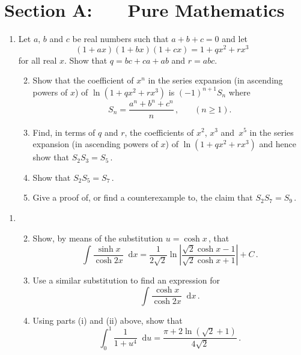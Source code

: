 \documentclass[a4, 11pt]{report}
\newlength{\qspace}
\newcounter{qnumber}
\newenvironment{question}%
 {\vspace{\qspace}
  \begin{enumerate}[\bfseries 1\quad][10]%
    \setcounter{enumi}{\value{qnumber}}%
    \item%
 }
{
  \end{enumerate}
  \filbreak
  \stepcounter{qnumber}
 }
\newenvironment{questionparts}[1][1]%
 {
  \begin{enumerate}[\bfseries (i)]%
    \setcounter{enumii}{#1}
    \addtocounter{enumii}{-1}
    \setlength{\itemsep}{5mm}
    \setlength{\parskip}{8pt}
 }
 {
  \end{enumerate}
 }
\def\ge{\geqslant}
\renewcommand{\.}[1]{\ensuremath{\mathrm{#1}}}
\newcommand{\+}[1]{\ensuremath{\mathbf{#1}}}
\newcommand{\ud}{\mathop{}\!\mathrm{d}}
\begin{document}
\setcounter{page}{2}

 
\section*{Section A: \ \ \ Pure Mathematics}

\begin{question}
Let $a$, $b$ and $c$ be real numbers such that $a+b+c=0$ and let
\[(1+ax)(1+bx)(1+cx) = 1+qx^2 +rx^3\,\]
for all real $x$. Show that $q = bc+ca+ab$ and $r= abc$.
\begin{questionparts}
\item Show that the coefficient of $x^n$ in the series expansion
(in ascending powers of $x$)   
 of $\ln (1+qx^2+rx^3)$ is $(-1)^{n+1} S_n$ where
\[S_n = \frac{a^n+b^n+c^n}{n} \,,  \ \ \ \ \ \ \ \ (n\ge1).\]
\item Find, in terms of $q$ and $r$, the coefficients of $x^2$,
$x^3$ and~$x^5$ in the series expansion (in ascending powers of $x$)
of $\ln (1+qx^2+rx^3)$ and hence show that $S_2S_3 =S_5$\,.
\item Show that $S_2S_5 =S_7$\,.
\item Give a proof of, or find a counterexample to, the claim that $S_2S_7=S_9$\,.
\end{questionparts}
\end{question}

\begin{question}
  \begin{questionparts}
  \item Show, by means of the  substitution $u=\cosh x\,$, that
    \[
    \int \frac{\sinh x}{\cosh 2x} \ud x 
= \frac 1{2\sqrt2} 
\ln \left\vert \frac{\sqrt2 \cosh x - 1}{\sqrt2 \cosh x + 1 } \right\vert
+ C
    \,.\]

  \item Use a similar substitution to find an expression for     
    \[
    \int \frac{\cosh x}{\cosh 2x} \ud x
    \,.\]

  \item Using parts (i) and (ii) above, show that
    \[
    \int_0^1 \frac 1{1+u^4} \ud u = \frac{\pi + 2\ln(\sqrt2 +1)}{4\sqrt2}\,.
    \]
  \end{questionparts}
\end{question}
\end{document}
